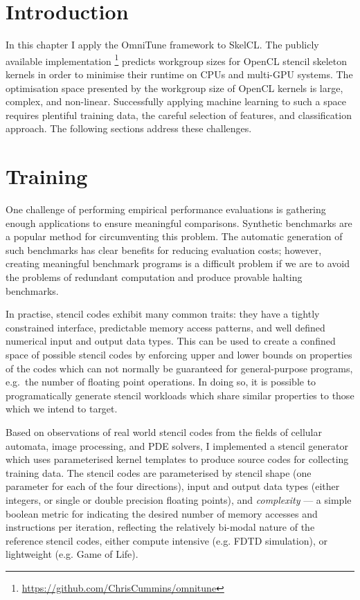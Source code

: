 \section{Introduction}

In this chapter I apply the OmniTune framework to SkelCL. The publicly
available implementation
\footnote{\url{https://github.com/ChrisCummins/omnitune}} predicts
workgroup sizes for OpenCL stencil skeleton kernels in order to
minimise their runtime on CPUs and multi-GPU systems. The optimisation
space presented by the workgroup size of OpenCL kernels is large,
complex, and non-linear. Successfully applying machine learning to
such a space requires plentiful training data, the careful selection
of features, and classification approach. The following sections
address these challenges.




\section{Training}\label{sec:training}

One challenge of performing empirical performance evaluations is
gathering enough applications to ensure meaningful
comparisons. Synthetic benchmarks are a popular method for
circumventing this problem. The automatic generation of such
benchmarks has clear benefits for reducing evaluation costs; however,
creating meaningful benchmark programs is a difficult problem if we
are to avoid the problems of redundant computation and produce
provable halting benchmarks.

In practise, stencil codes exhibit many common traits: they have a
tightly constrained interface, predictable memory access patterns, and
well defined numerical input and output data types. This can be used
to create a confined space of possible stencil codes by enforcing
upper and lower bounds on properties of the codes which can not
normally be guaranteed for general-purpose programs, e.g.\ the number
of floating point operations. In doing so, it is possible to
programatically generate stencil workloads which share similar
properties to those which we intend to target.

Based on observations of real world stencil codes from the fields of
cellular automata, image processing, and PDE solvers, I implemented a
stencil generator which uses parameterised kernel templates to produce
source codes for collecting training data. The stencil codes are
parameterised by stencil shape (one parameter for each of the four
directions), input and output data types (either integers, or single
or double precision floating points), and \emph{complexity} --- a
simple boolean metric for indicating the desired number of memory
accesses and instructions per iteration, reflecting the relatively
bi-modal nature of the reference stencil codes, either compute
intensive (e.g. FDTD simulation), or lightweight (e.g. Game of Life).

